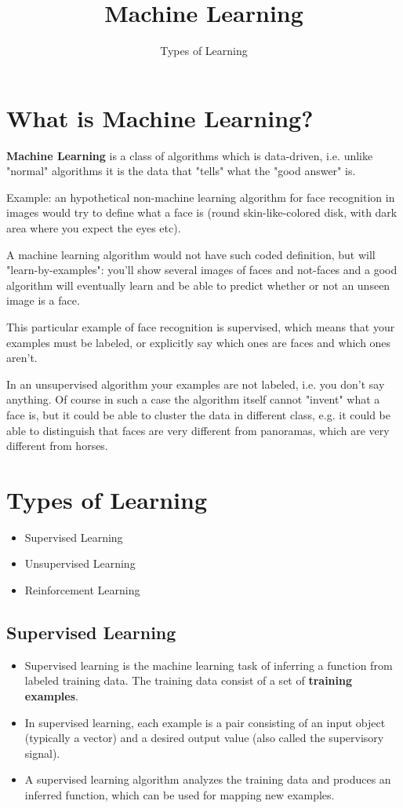\documentclass[11pt]{article} %
\title{Machine Learning }
\author{Types of Learning}
\begin{document}
\section{What is Machine Learning?}
\textbf{Machine Learning} is a class of algorithms which is data-driven, i.e. unlike "normal" algorithms it is the data that "tells" what the "good answer" is. 

Example: an hypothetical non-machine learning algorithm for face recognition in images would try to define what a face is (round skin-like-colored disk, with dark area where you expect the eyes etc). 

A machine learning algorithm would not have such coded definition, but will "learn-by-examples": you'll show several images of faces and not-faces and a good algorithm will eventually learn and be able to predict whether or not an unseen image is a face.

This particular example of face recognition is supervised, which means that your examples must be labeled, or explicitly say which ones are faces and which ones aren't.

In an unsupervised algorithm your examples are not labeled, i.e. you don't say anything. Of course in such a case the algorithm itself cannot "invent" what a face is, but it could be able to cluster the data in different class, e.g. it could be able to distinguish that faces are very different from panoramas, which are very different from horses.

\section{Types of Learning}
\begin{itemize}
\item Supervised Learning
\item Unsupervised Learning
\item Reinforcement Learning
\end{itemize}
\subsection{Supervised Learning}

\begin{itemize}
\item Supervised learning is the machine learning task of inferring a function from labeled training data. The training data consist of a set of \textbf{training examples}. 
\item In supervised learning, each example is a pair consisting of an input object (typically a vector) and a desired output value (also called the supervisory signal). \item A supervised learning algorithm analyzes the training data and produces an inferred function, which can be used for mapping new examples.
\end{itemize}
\end{document}
